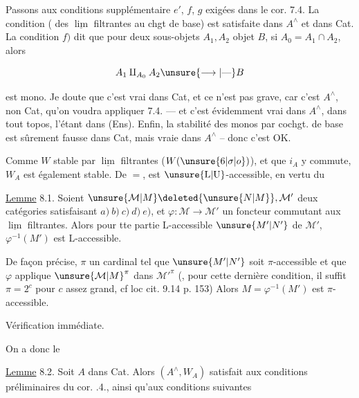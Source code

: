 
Passons aux conditions supplémentaire $e'$, $f$, $g$ exigées dans le cor. 7.4. La condition 
(  des $\underline{\lim}$ filtrantes au chgt de base) est satisfaite dans $A^\wedge$ et dans Cat. La
condition $f)$ dit que pour deux sous-objets $A_1,A_2$   objet $B$, si $A_0=A_1\cap A_2$,
alors

\[
 A_1\mathbin{\amalg}_{A_0}A_2\unsure{\longrightarrow|\text{---}}B
\]

est mono. Je doute que c'est vrai dans Cat, et ce n'est pas grave, car c'est  $A^\wedge$,
non  Cat, qu'on voudra appliquer 7.4. --- et c'est évidemment vrai dans $A^\wedge$,  
dans tout topos, l'étant dans (Ens). Enfin, la stabilité des monos par cochgt. de base
est sûrement fausse dans Cat, mais vraie dans $A^\wedge$ -- donc c'est OK.

Comme $W$ stable par $\underline{\lim}$ filtrantes
($W(\unsure{6|\sigma|o})$), et que $i_A$ y commute, $W_A$ est également stable. De $=$,  
 est $\unsure{\mathrm L|\mathrm U}$-accessible,  en vertu du

\uline{Lemme} 8.1. Soient $\unsure{\mathcal{M}|M}\deleted{\unsure{N|M}},\mathcal{M}'$ deux catégories satisfaisant $a)\ b)\ c)\ d)\ e)$, et $\varphi:\mathcal{M}\longrightarrow \mathcal{M}'$
un foncteur commutant aux $\underline{\lim}$ filtrantes. Alors pour tte partie $\mathrm L$-accessible $\unsure{M'|N'}$ de $\mathcal{M}'$, $\varphi^{-1}(M')$ est $\mathrm L$-accessible.

De façon précise,  $\pi$ un cardinal tel que
$\unsure{M'|N'}$ soit $\pi$-accessible et que $\varphi$ applique
$\unsure{\mathcal{M}|M}^\pi$ dans ${\mathcal{M}'}^\pi$ (, pour cette dernière
condition, il suffit $\pi=2^c$ pour $c$ assez
grand, cf loc cit. 9.14 p. 153) Alors 
$M=\varphi^{-1}(M')$ est $\pi$-accessible.

Vérification immédiate.

On a donc le

\uline{Lemme} 8.2. Soit $A$ dans Cat. Alors $(A^\wedge,W_A)$
satisfait aux conditions préliminaires du
cor. .4., ainsi qu'aux conditions suivantes

